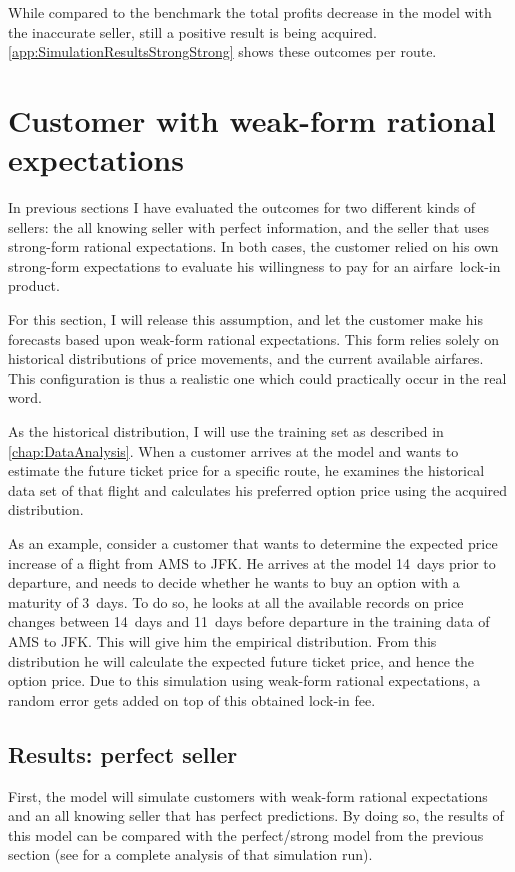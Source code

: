 While compared to the benchmark the total profits decrease in the model with the inaccurate seller, still a positive result is being acquired. \autoref{app:SimulationResultsStrongStrong} shows these outcomes per route.





\section{Customer with weak-form rational expectations}
\label{sec:WeakCustomer}
In previous sections I have evaluated the outcomes for two different kinds of sellers: the all knowing seller with perfect information, and the seller that uses strong-form rational expectations. In both cases, the customer relied on his own strong-form expectations to evaluate his willingness to pay for an airfare~lock-in product.

For this section, I will release this assumption, and let the customer make his forecasts based upon weak-form rational expectations. This form relies solely on historical distributions of price movements, and the current available airfares. This configuration is thus a realistic one which could practically occur in the real word.

As the historical distribution, I will use the training set as described in \autoref{chap:DataAnalysis}. When a customer arrives at the model and wants to estimate the future ticket price for a specific route, he examines the historical data set of that flight and calculates his preferred option price using the acquired distribution.

As an example, consider a customer that wants to determine the expected price increase of a flight from AMS to JFK. He arrives at the model 14~days prior to departure, and needs to decide whether he wants to buy an option with a maturity of 3~days. To do so, he looks at all the available records on price changes between 14~days and 11~days before departure in the training data of AMS to JFK. This will give him the empirical distribution. From this distribution he will calculate the expected future ticket price, and hence the option price. Due to this simulation using weak-form rational expectations, a random error gets added on top of this obtained lock-in fee.

\subsection{Results: perfect seller}
First, the model will simulate customers with weak-form rational expectations and an all knowing seller that has perfect predictions. By doing so, the results of this model can be compared with the perfect/strong model from the previous section (see  for a complete analysis of that simulation run).

